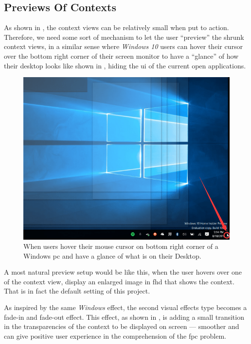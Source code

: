 \subsection{Previews Of Contexts}


As shown in , the context views can be relatively small when put to action. Therefore, we need some sort of mechanism to let the user ``preview'' the shrunk context views, in a similar sense where \emph{Windows 10} users can hover their cursor over the bottom right corner of their screen monitor to have a ``glance'' of how their desktop looks like shown in , hiding the \gls{ui} of the current open applications.

\begin{figure}[H]
\centering
\includegraphics[width=\textwidth,keepaspectratio]{Figures/Chapter1/winpreview.png}
\decoRule
\caption[``Preview'' Mechanism on Windows 10]{When users hover their mouse cursor on bottom right corner of a Windows \gls{pc} and have a glance of what is on their Desktop.}
\label{fig:winpreview}
\end{figure}

A most natural preview setup would be like this, when the user hovers over one of the context view, display an enlarged image in \gls{fhd} that shows the context. That is in fact the default setting of this project.

As inspired by the same \emph{Windows} effect, the second visual effects type becomes a fade-in and fade-out effect. This effect, as shown in , is adding a small transition in the transparencies of the context to be displayed on screen --- smoother and can give positive user experience in the comprehension of the \gls{fpc} problem.

